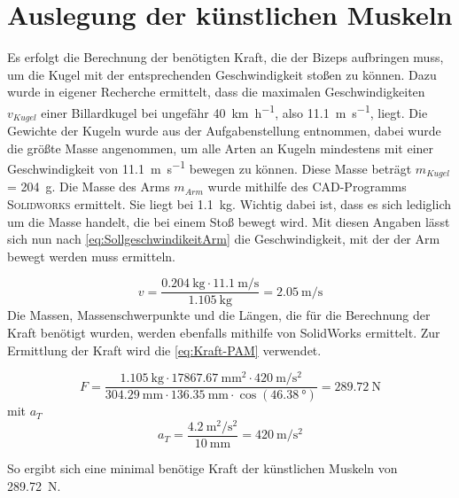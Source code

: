 	\section{Auslegung der künstlichen Muskeln}
		Es erfolgt die Berechnung der benötigten Kraft, die der Bizeps aufbringen muss, um die Kugel mit der entsprechenden Geschwindigkeit stoßen zu können. 
		Dazu wurde in eigener Recherche ermittelt, dass die maximalen Geschwindigkeiten \(v_{Kugel}\) einer Billardkugel bei ungefähr \SI{40}{\kilo\metre\per\hour}, also \SI{11,1}{\metre\per\second}, liegt.
		Die Gewichte der Kugeln wurde aus der Aufgabenstellung entnommen, dabei wurde die größte Masse angenommen, um alle Arten an Kugeln mindestens mit einer Geschwindigkeit von \SI{11,1}{\metre\per\second} bewegen zu können.
		Diese Masse beträgt \(m_{Kugel}\) = \SI{204}{\gram}.
		Die Masse des Arms \(m_{Arm}\) wurde mithilfe des CAD-Programms \textsc{Solidworks} ermittelt. Sie liegt bei \SI{1,1}{\kilo\gram}.
		Wichtig dabei ist, dass es sich lediglich um die Masse handelt, die bei einem Stoß bewegt wird. 
		Mit diesen Angaben lässt sich nun nach \cref{eq:SollgeschwindikeitArm} die Geschwindigkeit, mit der der Arm bewegt werden muss ermitteln. 

		\begin{equation}
			v= \frac{\SI{0,204}{\kilogram} \cdot \SI{11,1}{\metre\per\second}}{\SI{1,105}{\kilogram}} = \SI{2,05}{\metre\per\second}
			\label{eq:SollgeschwindikeitArmZahlen}
		\end{equation}
		Die Massen, Massenschwerpunkte und die Längen, die für die Berechnung der Kraft benötigt wurden, werden ebenfalls mithilfe von SolidWorks ermittelt. 
		Zur Ermittlung der Kraft wird die \cref{eq:Kraft-PAM} verwendet. 

		\begin{equation}
			F =\frac{\SI{1,105}{\kilogram} \cdot \SI{17867,67}{\milli\metre\squared} \cdot \SI{420}{\metre\per\second\squared}}{\SI{304,29}{\milli\metre} \cdot \SI{136,35}{\milli\metre} \cdot \cos{\left(\SI{46,38}{\degree}\right)}} = \SI{289,72}{\newton}
		\end{equation}
		mit \(a_T\)
		\begin{equation}
			a_T = \frac{\SI{4,2}{\metre\squared\per\second\squared}}{\SI{10}{\milli\metre}} = \SI{420}{\metre\per\second\squared}
		\end{equation}
		
		So ergibt sich eine minimal benötige Kraft der künstlichen Muskeln von \SI{289,72}{\newton}.